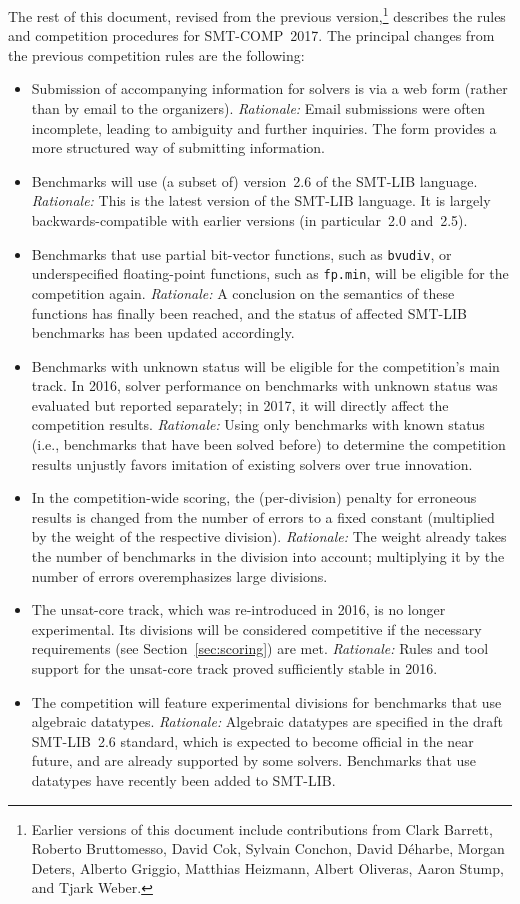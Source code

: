\documentclass[12pt]{article}
\begin{document}
The rest of this document, revised from the previous
version,\footnote{Earlier versions of this document include
  contributions from Clark Barrett, Roberto Bruttomesso, David Cok,
  Sylvain Conchon, David D{\'e}harbe, Morgan Deters, Alberto Griggio,
  Matthias Heizmann, Albert Oliveras, Aaron Stump, and Tjark Weber.}
describes the rules and competition procedures for SMT-COMP~2017.  The
principal changes from the previous competition rules are the
following:
\begin{itemize}
\item Submission of accompanying information for solvers is via a web
  form (rather than by email to the organizers).  \emph{Rationale:}
  Email submissions were often incomplete, leading to ambiguity and
  further inquiries.  The form provides a more structured way of
  submitting information.
\item Benchmarks will use (a subset of) version~2.6 of the SMT-LIB
  language.  \emph{Rationale:} This is the latest version of the
  SMT-LIB language.  It is largely backwards-compatible with earlier
  versions (in particular~2.0 and~2.5).
\item Benchmarks that use partial bit-vector functions, such as
  \texttt{bvudiv}, or underspecified floating-point functions, such as
  \texttt{fp.min}, will be eligible for the competition again.
  \emph{Rationale:} A conclusion on the semantics of these functions
  has finally been reached, and the status of affected SMT-LIB
  benchmarks has been updated accordingly.
\item Benchmarks with unknown status will be eligible for the
  competition's main track.  In 2016, solver performance on benchmarks
  with unknown status was evaluated but reported separately; in 2017,
  it will directly affect the competition results.  \emph{Rationale:}
  Using only benchmarks with known status (i.e., benchmarks that have
  been solved before) to determine the competition results unjustly
  favors imitation of existing solvers over true innovation.
\item In the competition-wide scoring, the (per-division) penalty for
  erroneous results is changed from the number of errors to a fixed
  constant (multiplied by the weight of the respective division).
  \emph{Rationale:} The weight already takes the number of benchmarks
  in the division into account; multiplying it by the number of errors
  overemphasizes large divisions.
\item The unsat-core track, which was re-introduced in 2016, is no
  longer experimental.  Its divisions will be considered competitive
  if the necessary requirements (see Section~\ref{sec:scoring}) are
  met.  \emph{Rationale:} Rules and tool support for the unsat-core
  track proved sufficiently stable in 2016.
\item The competition will feature experimental divisions for
  benchmarks that use algebraic datatypes.  \emph{Rationale:}
  Algebraic datatypes are specified in the draft SMT-LIB~2.6 standard,
  which is expected to become official in the near future, and are
  already supported by some solvers.  Benchmarks that use datatypes
  have recently been added to SMT-LIB.
\end{itemize}
\end{document}
